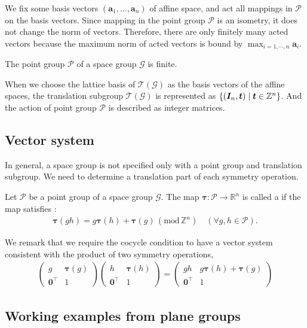We fix some basis vectors $(\bm{a}_{1}, \dots, \bm{a}_{n})$ of affine space, and act all mappings in $\mathcal{P}$ on the basis vectors.
Since mapping in the point group $\mathcal{P}$ is an isometry, it does not change the norm of vectors.
Therefore, there are only finitely many acted vectors because the maximum norm of acted vectors is bound by $\max_{i=1,\cdots,n} \mathbf{a}_{i}$.

\begin{screen}
  \begin{theorem}
    The point group $\mathcal{P}$ of a space group $\mathcal{G}$ is finite.
  \end{theorem}
\end{screen}

When we choose the lattice basis of $\mathcal{T}(\mathcal{G})$ as the basis vectors of the affine spaces, the translation subgroup $\mathcal{T}(\mathcal{G})$ is represented as $\left\{  (\bm{I}_{n}, \bm{t})  \mathrel{}\middle|\mathrel{}  \bm{t} \in \mathbb{Z}^{n}  \right\}$.
And the action of point group $\mathcal{P}$ is described as integer matrices.

\subsection{Vector system}

In general, a space group is not specified only with a point group and translation subgroup.
We need to determine a translation part of each symmetry operation.

\begin{screen}
  \begin{defn}
    Let $\mathcal{P}$ be a point group of a space group $\mathcal{G}$.
    The map $\bm{\tau}: \mathcal{P} \to \mathbb{R}^{n}$ is called a  if the map satisfies :
    \begin{align}
      \bm{\tau}(gh) = g \bm{\tau}(h) + \bm{\tau}(g) \, ( \mathrm{mod} \, \mathbb{Z}^{n}) \quad (\forall g, h \in \mathcal{P}).
    \end{align}
  \end{defn}
\end{screen}

We remark that we require the cocycle condition to have a vector system consistent with the product of two symmetry operations,
\begin{align*}
  \begin{pmatrix}
    g & \bm{\tau}(g) \\
    \bm{0}^{\top} & 1
  \end{pmatrix}
  \begin{pmatrix}
    h & \bm{\tau}(h) \\
    \bm{0}^{\top} & 1
  \end{pmatrix}
  =
  \begin{pmatrix}
    gh & g \bm{\tau}(h) + \bm{\tau}(g) \\
    \bm{0}^{\top} & 1
  \end{pmatrix}
\end{align*}


\subsection{Working examples from plane groups}
